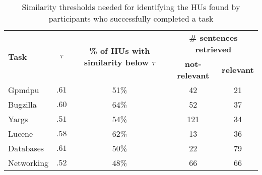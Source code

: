\begin{table}
\centering    
\caption{Similarity thresholds needed for identifying the HUs found 
by participants who successfully completed a task}
\begin{footnotesize}
\begin{threeparttable} 
\begin{tabular}{l|c|c|c|c}
\hline    
\multirow{2}{*}{\textbf{Task}} 
& \multirow{2}{*}{\textbf{$\tau$}} 
& \multirow{2}{2.2cm}{\scriptsize \centering \textbf{\% of HUs with similarity below $\tau$}} 
& \multicolumn{2}{c}{\textbf{\# sentences retrieved}} \\
\cline{4-5}

& 
&
& \textbf{not-relevant} 
& \textbf{relevant}
\\

\hline    
\hline

\rowcolor{lightgray}
Gpmdpu & $.61$ & 51\% & 42 & 21  \\

\rowcolor{white}
Bugzilla & $.60$ & 64\% & 52 & 37  \\

\rowcolor{lightgray}
Yargs & $.51$ & 54\% & 121 & 34  \\

\rowcolor{white}
Lucene & $.58$ & 62\% & 13 & 36  \\

\rowcolor{lightgray}
Databases & $.61$ & 50\% & 22 & 79  \\

\rowcolor{white}
Networking & $.52$ & 48\% & 66 & 66  \\
\hline  

\end{tabular}
\begin{tablenotes}
\end{tablenotes}   
\end{threeparttable} 
\end{footnotesize}
\label{tbl:ir-threshold}
\end{table}
    